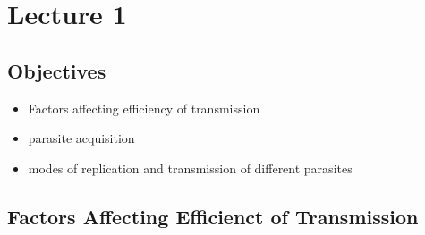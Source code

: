 \documentclass{article}
\begin{document}
    \section*{Lecture 1}
        \subsection*{Objectives}
            \begin{itemize}
                \item Factors affecting efficiency of transmission
                \item parasite acquisition
                \item modes of replication and transmission of different parasites
            \end{itemize}
        \subsection*{Factors Affecting Efficienct of Transmission}
\end{document}
